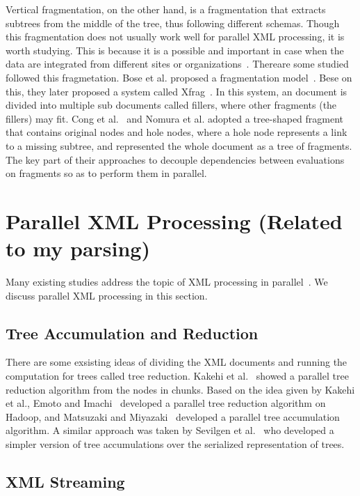 Vertical fragmentation, on the other hand, is a fragmentation that extracts
subtrees from the middle of the tree, thus following different schemas. Though
this fragmentation does not usually work well for parallel XML processing, it is
worth studying. This is because it is a possible and  important in case when the
data are integrated from different sites or organizations~\cite{CFKL12,KlOD10}.
Thereare some studied followed this fragmetation.  Bose et al. proposed a
fragmentation model~\cite{bose2003query}. Bese on this, they later proposed a
system called Xfrag~\cite{bose2005xfrag}. In this system, an document is divided
into multiple sub documents called fillers, where other fragments (the fillers)
may fit.  Cong et al.~\cite{CFKL12} and Nomura et al. \cite{NEMH07} adopted a
tree-shaped fragment that contains original nodes and hole nodes, where a hole
node represents a link to a missing subtree, and represented the whole document
as a tree of fragments. The key part of their approaches to decouple
dependencies between evaluations on fragments so as to perform them in parallel. 

\section{Parallel XML Processing (Related to my parsing)}
\label{sec:paralleleval}

Many existing studies address the topic of XML processing in
parallel~\cite{BoLS09,PaZC08,LuGa08,Mats09,SAFu05}. We discuss parallel XML
processing in this section.

\subsection{Tree Accumulation and Reduction}

There are some exsisting ideas of dividing the XML documents and running the
computation for trees called tree reduction. Kakehi et al.~\cite{KaME07} showed
a parallel tree reduction algorithm from the nodes in chunks. Based on the idea
given by Kakehi et al., Emoto and Imachi~\cite{EmIm12} developed a parallel tree
reduction algorithm on Hadoop, and Matsuzaki and Miyazaki~\cite{MaMi16}
developed a parallel tree accumulation algorithm. A similar approach was taken
by Sevilgen et al.~\cite{SAFu05} who developed a simpler version of tree
accumulations over the serialized representation of trees.

\subsection{XML Streaming}

